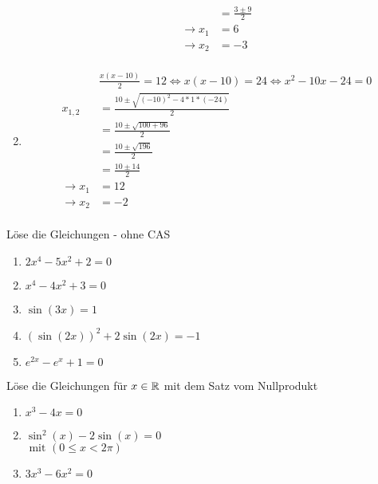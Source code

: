 \begin{lsg}{}
\begin{enumerate}
\begin{align*}
        &=\frac{3\pm9}{2}\\
        \rightarrow x_1&=6\\
        \rightarrow x_2&=-3\\
      \end{align*}
      \item
      \begin{align*}
        &\frac{x(x-10)}{2} = 12 \Leftrightarrow x(x-10)=24 \Leftrightarrow x^2 - 10x - 24 = 0\\
        x_{1,2}&=\frac{10\pm\sqrt{(-10)^2-4*1*(-24)}}{2}\\
        &=\frac{10\pm\sqrt{100+96}}{2}\\
        &=\frac{10\pm\sqrt{196}}{2}\\
        &=\frac{10\pm14}{2}\\
        \rightarrow x_1&=12\\
        \rightarrow x_2&=-2\\
      \end{align*}
    \end{enumerate}
\end{lsg}




 Löse die Gleichungen - ohne CAS
\begin{multicols}{3}
  \begin{enumerate}
    \item $2x^4 - 5x^2 + 2 = 0$
    \item $x^4 - 4x^2 + 3 = 0$
    \item $\sin(3x) = 1$
    \item $(\sin(2x))^2 + 2\sin(2x) = -1$
    \item $e^{2x} - e^x + 1 = 0$
  \end{enumerate}
\end{multicols}





 Löse die Gleichungen für $x\in \mathbb{R}$ mit dem Satz vom Nullprodukt
\begin{multicols}{3}
  \begin{enumerate}
    \item $x^3 - 4x = 0$
    \item $\sin^2(x)-2\sin(x) = 0$\\ $\text{ mit }(0\leq x<2\pi)$
    \item $3x^3-6x^2=0$
  \end{enumerate}
\end{multicols}

